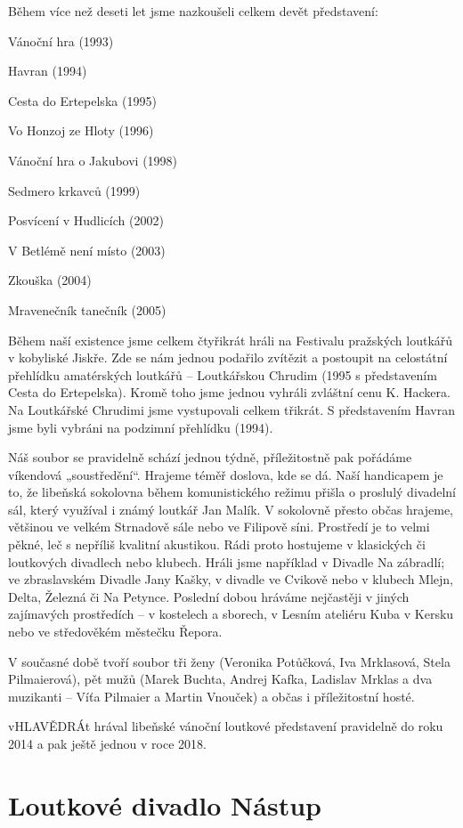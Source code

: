 Během více než deseti let jsme nazkoušeli celkem devět představení:

Vánoční hra (1993)

Havran (1994)

Cesta do Ertepelska (1995)

Vo Honzoj ze Hloty (1996)

Vánoční hra o Jakubovi (1998)

Sedmero krkavců (1999)

Posvícení v Hudlicích (2002)

V Betlémě není místo (2003)

Zkouška (2004)

Mravenečník tanečník (2005)

Během naší existence jsme celkem čtyřikrát hráli na Festivalu pražských
loutkářů v kobyliské Jiskře. Zde se nám jednou podařilo zvítězit a
postoupit na celostátní přehlídku amatérských loutkářů -- Loutkářskou
Chrudim (1995 s představením Cesta do Ertepelska). Kromě toho jsme
jednou vyhráli zvláštní cenu K. Hackera. Na Loutkářské Chrudimi jsme
vystupovali celkem třikrát. S představením Havran jsme byli vybráni na
podzimní přehlídku (1994).

Náš soubor se pravidelně schází jednou týdně, příležitostně pak pořádáme
víkendová „soustředění``. Hrajeme téměř doslova, kde se dá. Naší
handicapem je to, že libeňská sokolovna během komunistického režimu
přišla o proslulý divadelní sál, který využíval i známý loutkář Jan
Malík. V sokolovně přesto občas hrajeme, většinou ve velkém Strnadově
sále nebo ve Filipově síni. Prostředí je to velmi pěkné, leč s nepříliš
kvalitní akustikou. Rádi proto hostujeme v klasických či loutkových
divadlech nebo klubech. Hráli jsme například v Divadle Na zábradlí; ve
zbraslavském Divadle Jany Kašky, v divadle ve Cvikově nebo v klubech
Mlejn, Delta, Železná či Na Petynce. Poslední dobou hráváme nejčastěji v
jiných zajímavých prostředích -- v kostelech a sborech, v Lesním
ateliéru Kuba v Kersku nebo ve středověkém městečku Řepora.

V současné době tvoří soubor tři ženy (Veronika Potůčková, Iva
Mrklasová, Stela Pilmaierová), pět mužů (Marek Buchta, Andrej Kafka,
Ladislav Mrklas a dva muzikanti -- Víťa Pilmaier a Martin Vnouček) a
občas i příležitostní hosté.

vHLAVĚDRÁt hrával libeňské vánoční loutkové představení pravidelně do
roku 2014 a pak ještě jednou v roce 2018.

\section{Loutkové divadlo Nástup}\label{loutkovuxe9-divadlo-nuxe1stup}

